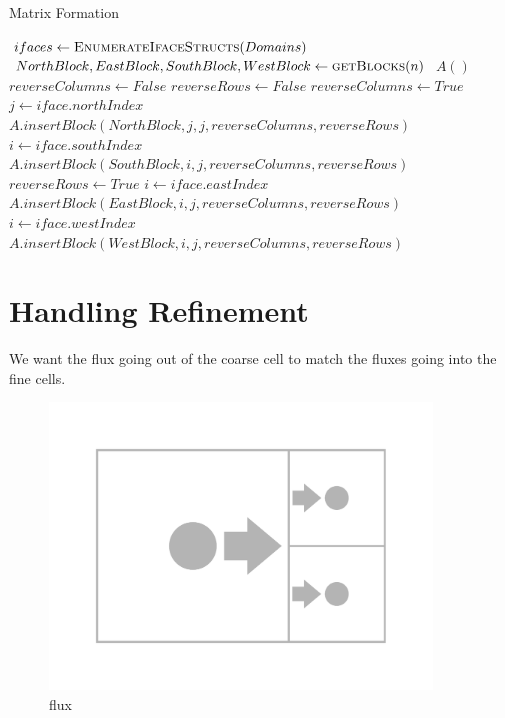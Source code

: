 \documentclass[12pt]{article}
\begin{document}
\begin{algorithm}[H]
\caption{Matrix Formation}
\begin{algorithmic}[1]
    \State $ifaces \gets \Call{EnumerateIfaceStructs}{Domains}$
    \State $NorthBlock, EastBlock, SouthBlock, WestBlock \gets \Call{getBlocks}{n}$
    \State $A()$ 
     
        \State $reverseColumns \gets False$
        \State $reverseRows \gets False$
             \State $reverseColumns \gets True$
        \EndIf
        \State
        \State $j \gets iface.northIndex$
        \State $A.insertBlock(NorthBlock,j,j,reverseColumns,reverseRows)$
        \State
            \State $i \gets iface.southIndex$
            \State $A.insertBlock(SouthBlock,i,j,reverseColumns,reverseRows)$
        \EndIf
        \State
             \State $reverseRows \gets True$
        \EndIf
        \State
            \State $i \gets iface.eastIndex$
            \State $A.insertBlock(EastBlock,i,j,reverseColumns,reverseRows)$
        \EndIf
        \State
            \State $i \gets iface.westIndex$
            \State $A.insertBlock(WestBlock,i,j,reverseColumns,reverseRows)$
        \EndIf
        \State
    \EndFor
    \EndProcedure
\end{algorithmic}
\end{algorithm}




\section{Handling Refinement}
We want the flux going out of the coarse cell to match the fluxes going into 
the fine cells.

\begin{figure}[H]
    \centering
    \includegraphics[width=4in]{images/amrflux.pdf}
    \caption{flux}
\end{figure}
\end{document}
